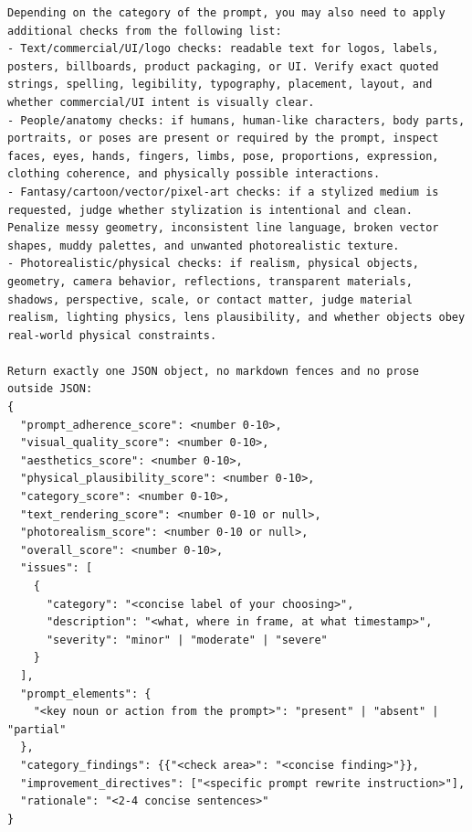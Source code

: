 \begin{tcolorbox}
\begin{Verbatim}[breaklines=true,breakanywhere=true,fontsize=\scriptsize]
Depending on the category of the prompt, you may also need to apply additional checks from the following list:
- Text/commercial/UI/logo checks: readable text for logos, labels, posters, billboards, product packaging, or UI. Verify exact quoted strings, spelling, legibility, typography, placement, layout, and whether commercial/UI intent is visually clear.
- People/anatomy checks: if humans, human-like characters, body parts, portraits, or poses are present or required by the prompt, inspect faces, eyes, hands, fingers, limbs, pose, proportions, expression, clothing coherence, and physically possible interactions.
- Fantasy/cartoon/vector/pixel-art checks: if a stylized medium is requested, judge whether stylization is intentional and clean. Penalize messy geometry, inconsistent line language, broken vector shapes, muddy palettes, and unwanted photorealistic texture.
- Photorealistic/physical checks: if realism, physical objects, geometry, camera behavior, reflections, transparent materials, shadows, perspective, scale, or contact matter, judge material realism, lighting physics, lens plausibility, and whether objects obey real-world physical constraints.

Return exactly one JSON object, no markdown fences and no prose outside JSON:
{
  "prompt_adherence_score": <number 0-10>,
  "visual_quality_score": <number 0-10>,
  "aesthetics_score": <number 0-10>,
  "physical_plausibility_score": <number 0-10>,
  "category_score": <number 0-10>,
  "text_rendering_score": <number 0-10 or null>,
  "photorealism_score": <number 0-10 or null>,
  "overall_score": <number 0-10>,
  "issues": [
    {
      "category": "<concise label of your choosing>",
      "description": "<what, where in frame, at what timestamp>",
      "severity": "minor" | "moderate" | "severe"
    }
  ],
  "prompt_elements": {
    "<key noun or action from the prompt>": "present" | "absent" | "partial"
  },
  "category_findings": {{"<check area>": "<concise finding>"}},
  "improvement_directives": ["<specific prompt rewrite instruction>"],
  "rationale": "<2-4 concise sentences>"
}
\end{Verbatim}
\end{tcolorbox}


